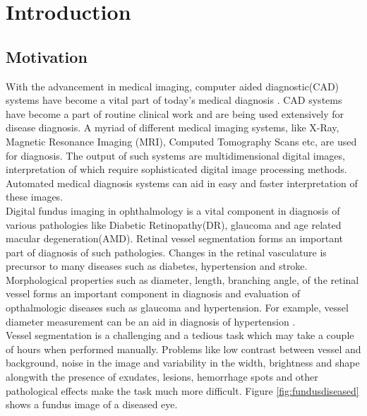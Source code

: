 
\chapter{Introduction}  %

\ifpdf
\graphicspath{{Chapter1/Figs/Raster/}{Chapter1/Figs/PDF/}{Chapter1/Figs/}}
\else
\graphicspath{{Chapter1/Figs/Vector/}{Chapter1/Figs/}}
\fi


\section{Motivation}
With the advancement in medical imaging, computer aided diagnostic(CAD) systems have become a vital part of today's medical diagnosis \cite{doi2007computer}. CAD systems have become a part of routine clinical work and are being used extensively for disease diagnosis. A myriad of different medical imaging systems, like X-Ray, Magnetic Resonance Imaging (MRI), Computed Tomography Scans etc, are used for diagnosis. The output of such systems are multidimensional digital images, interpretation of which require sophisticated digital image processing methods. Automated medical diagnosis systems can aid in easy and faster interpretation of these images.\\	

Digital fundus imaging in ophthalmology is a vital component in diagnosis of various pathologies like Diabetic Retinopathy(DR), glaucoma and age related macular degeneration(AMD). Retinal vessel segmentation forms an important part of diagnosis of such pathologies. Changes in the retinal vasculature is precursor to many diseases such as diabetes, hypertension and stroke. Morphological properties such as diameter, length, branching angle, of the retinal vessel forms an important component in diagnosis and evaluation of opthalmologic diseases such as glaucoma and hypertension. For example, vessel diameter measurement can be an aid in diagnosis of hypertension \cite{calvo2011automatic}.\\

Vessel segmentation is a challenging and a tedious task which may take a couple of hours when performed manually. Problems like low contrast between vessel and background, noise in the image and variability in the width, brightness and shape alongwith the presence of exudates, lesions, hemorrhage spots and other pathological effects make the task much more difficult. Figure \ref{fig:fundusdiseased} shows a fundus image of a diseased eye.\\

